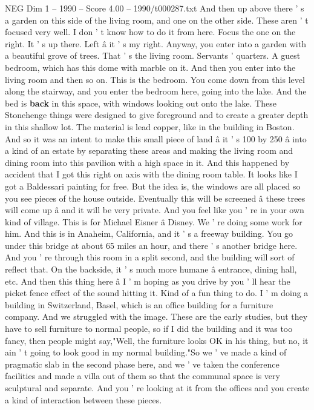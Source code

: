 \begin{textsample}{NEG Dim 1 – 1990 – Score 4.00 – 1990/t000287.txt}
And then up above there ' s a garden on this side of the living room, and one on the other side.
These aren ' t focused very well.
I don ' t know how to do it from here.
Focus the one on the right.
It ' s up there.
Left â it ' s my right.
Anyway, you enter into a garden with a beautiful grove of trees.
That ' s the living room.
Servants ' quarters.
A guest bedroom, which has this dome with marble on it.
And then you enter into the living room and then so on.
This is the bedroom.
You come down from this level along the stairway, and you enter the bedroom here, going into the lake.
And the bed is \textbf{back} in this space, with windows looking out onto the lake.
These Stonehenge things were designed to give foreground and to create a greater depth in this shallow lot.
The material is lead copper, like in the building in Boston.
And so it was an intent to make this small piece of land â it ' s 100 by 250 â into a kind of an estate by separating these areas and making the living room and dining room into this pavilion with a high space in it.
And this happened by accident that I got this right on axis with the dining room table.
It looks like I got a Baldessari painting for free.
But the idea is, the windows are all placed so you see pieces of the house outside.
Eventually this will be screened â these trees will come up â and it will be very private.
And you feel like you ' re in your own kind of village.
This is for Michael Eisner â Disney.
We ' re doing some work for him.
And this is in Anaheim, California, and it ' s a freeway building.
You go under this bridge at about 65 miles an hour, and there ' s another bridge here.
And you ' re through this room in a split second, and the building will sort of reflect that.
On the backside, it ' s much more humane â entrance, dining hall, etc.
And then this thing here â I ' m hoping as you drive by you ' ll hear the picket fence effect of the sound hitting it.
Kind of a fun thing to do.
I ' m doing a building in Switzerland, Basel, which is an office building for a furniture company.
And we struggled with the image.
These are the early studies, but they have to sell furniture to normal people, so if I did the building and it was too fancy, then people might say,"Well, the furniture looks OK in his thing, but no, it ain ' t going to look good in my normal building."So we ' ve made a kind of pragmatic slab in the second phase here, and we ' ve taken the conference facilities and made a villa out of them so that the communal space is very sculptural and separate.
And you ' re looking at it from the offices and you create a kind of interaction between these pieces.

\end{textsample}
